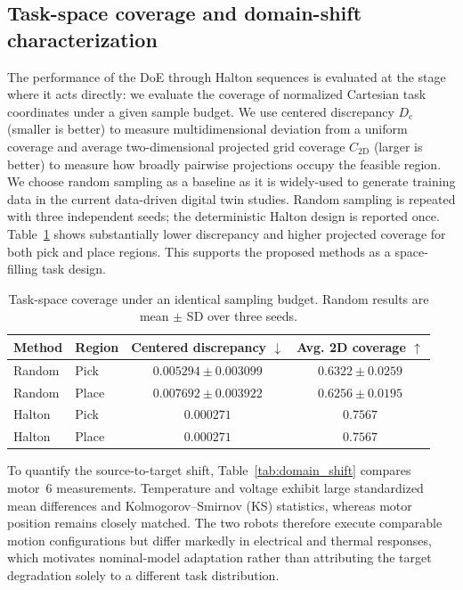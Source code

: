 \documentclass[a4paper,10pt]{cas-sc}%
\newenvironment{revision}{\color{revisionred}}{}
\begin{document}
\subsection{Task-space coverage and domain-shift characterization}\label{sec:5-sensitivity}

\begin{revision}
	The performance of the DoE through Halton sequences is evaluated at the stage where it acts directly: we evaluate the coverage of normalized Cartesian task coordinates under a given sample budget. We use centered discrepancy $D_c$ (smaller is better) to measure multidimensional deviation from a uniform coverage and average two-dimensional projected grid coverage $C_{2\mathrm{D}}$ (larger is better) to measure how broadly pairwise projections occupy the feasible region. We choose random sampling as a baseline as it is widely-used to generate training data in the current data-driven digital twin studies. Random sampling is repeated with three independent seeds; the deterministic Halton design is reported once. Table~\ref{tab:doe_coverage} shows substantially lower discrepancy and higher projected coverage for both pick and place regions. This supports the proposed methods as a space-filling task design.
\end{revision}

\begin{table}[pos=htbp]
	\centering
	\color{revisionred}
	\caption{\color{revisionred}Task-space coverage under an identical sampling budget. Random results are mean $\pm$ SD over three seeds.}
	\label{tab:doe_coverage}
	\begin{tabular}{llcc}
		\toprule
		Method & Region & Centered discrepancy $\downarrow$ & Avg. 2D coverage $\uparrow$ \\
		\midrule
		Random & Pick   & $0.005294\pm0.003099$             & $0.6322\pm0.0259$           \\
		Random & Place  & $0.007692\pm0.003922$             & $0.6256\pm0.0195$           \\
		Halton & Pick   & $0.000271$                        & $0.7567$                    \\
		Halton & Place  & $0.000271$                        & $0.7567$                    \\
		\bottomrule
	\end{tabular}
\end{table}

\begin{revision}
	To quantify the source-to-target shift, Table~\ref{tab:domain_shift} compares motor~6 measurements. Temperature and voltage exhibit large standardized mean differences and Kolmogorov--Smirnov (KS) statistics, whereas motor position remains closely matched. The two robots therefore execute comparable motion configurations but differ markedly in electrical and thermal responses, which motivates nominal-model adaptation rather than attributing the target degradation solely to a different task distribution.
\end{revision}
\end{document}
